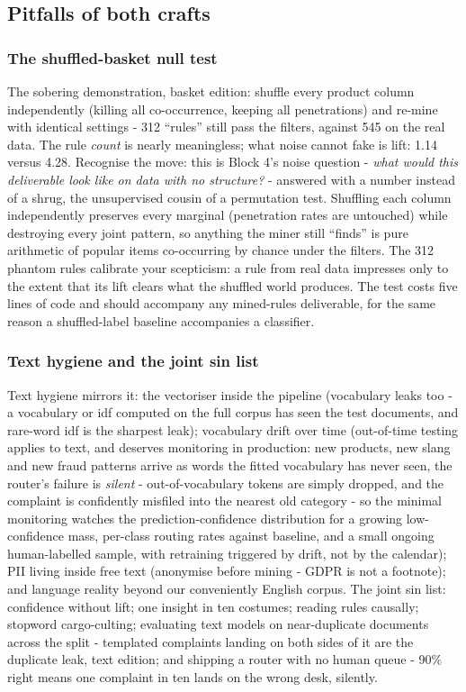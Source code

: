 \documentclass[11pt,a4paper]{article}
\begin{document}
\subsection{Pitfalls of both crafts}

\subsubsection{The shuffled-basket null test}
The sobering demonstration, basket edition: shuffle every product column
independently (killing all co-occurrence, keeping all penetrations) and
re-mine with identical settings - 312 ``rules'' still pass the filters,
against 545 on the real data. The rule \emph{count} is nearly
meaningless; what noise cannot fake is lift: 1.14 versus 4.28. Recognise
the move: this is Block 4's noise question - \emph{what would this
deliverable look like on data with no structure?} - answered with a
number instead of a shrug, the unsupervised cousin of a permutation
test. Shuffling each column independently preserves every marginal
(penetration rates are untouched) while destroying every joint pattern,
so anything the miner still ``finds'' is pure arithmetic of popular
items co-occurring by chance under the filters. The 312 phantom rules
calibrate your scepticism: a rule from real data impresses only to the
extent that its lift clears what the shuffled world produces. The test
costs five lines of code and should accompany any mined-rules
deliverable, for the same reason a shuffled-label baseline accompanies a
classifier.

\subsubsection{Text hygiene and the joint sin list}
Text hygiene mirrors it: the vectoriser inside the pipeline (vocabulary
leaks too - a vocabulary or idf computed on the full corpus has seen
the test documents, and rare-word idf is the sharpest leak); vocabulary
drift over time (out-of-time testing applies to text, and deserves
monitoring in production: new products, new slang and new fraud patterns
arrive as words the fitted vocabulary has never seen, the router's
failure is \emph{silent} - out-of-vocabulary tokens are simply dropped,
and the complaint is confidently misfiled into the nearest old category
- so the minimal monitoring watches the prediction-confidence
distribution for a growing low-confidence mass, per-class routing rates
against baseline, and a small ongoing human-labelled sample, with
retraining triggered by drift, not by the calendar); PII living inside
free text (anonymise before mining - GDPR is not a footnote); and
language reality beyond our conveniently English corpus. The joint sin
list: confidence without lift; one insight in ten costumes; reading
rules causally; stopword cargo-culting; evaluating text models on
near-duplicate documents across the split - templated complaints
landing on both sides of it are the duplicate leak, text edition; and
shipping a router with no human queue - 90\% right means one complaint
in ten lands on the wrong desk, silently.
\end{document}

